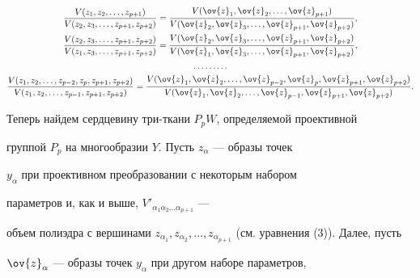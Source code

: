 \begin{gather*}


\frac{V(z_{1}, z_{2}, \dotsc, z_{p+1})}{V(z_{2}, z_{3},


\dotsc, z_{p+1}, z_{p+2})}


=\frac{V(\ov{z}_{1}, \ov{z}_{2}, \dotsc, \ov{z}_{p+1})}


{V(\ov{z}_{2}, \ov{z}_{3}, \dotsc, \ov{z}_{p+1}, \ov{z}_{p+2})},\\


%


\frac{V(z_{2}, z_{3}, \dotsc, z_{p+1}, z_{p+2})}{V(z_{1}, z_{3},


\dotsc, z_{p+1}, z_{p+2})}


=\frac{V(\ov{z}_{2}, \ov{z}_{3}, \dotsc, \ov{z}_{p+1}, \ov{z}_{p+2})}


{V(\ov{z}_{1}, \ov{z}_{3}, \dotsc, \ov{z}_{p+1}, \ov{z}_{p+2})},\\


%


\dotsc \dotsc \dotsc \\


%


\frac{V(z_{1}, z_{2}, \dotsc, z_{p-2}, z_{p}, z_{p+1}, z_{p+2})}


{V(z_{1}, z_{2}, \dotsc, z_{p-1}, z_{p+1}, z_{p+2})}


=\frac{V(\ov{z}_{1}, \ov{z}_{2}, \dotsc, \ov{z}_{p-2},


\ov{z}_{p}, \ov{z}_{p+1}, \ov{z}_{p+2})}{V(\ov{z}_{1},


\ov{z}_{2}, \dotsc, \ov{z}_{p-1}, \ov{z}_{p+1}, \ov{z}_{p+2})}.


\end{gather*}





Теперь найдем сердцевину три-ткани $P_{p}W$, определяемой проективной


группой $P_{p}$ на многообразии $Y$. Пусть $z_{\alpha}$ --- образы точек


$y_{\alpha}$ при проективном преобразовании с некоторым набором


параметров и, как и выше, $V'_{\alpha_{1}\alpha_{2}\dotsc\alpha_{p+1}}$ ---


объем полиэдра с вершинами $z_{\alpha_{1}}, z_{\alpha_{2}}, \dotsc,


z_{\alpha_{p+1}}$ (см. уравнения (3)). Далее, пусть


$\ov{z}_{\alpha}$ --- образы точек $y_{\alpha}$ при другом наборе параметров,


